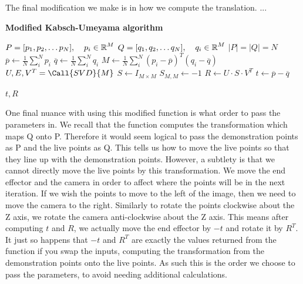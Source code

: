 The final modification we make is in how we compute the translation. ... %

\begin{algorithm}
    \setlength{\baselineskip}{18pt}
    \caption{\textbf{Modified Kabsch-Umeyama algorithm}}\label{alg:modified-kabsch}
    \begin{algorithmic}[1]
        \Require $P = [p_1, p_2, \dots p_N], \operatorname{\: \: \: \:} p_i \in \operatorname{\mathbb{R}}^M$
        \Statex $Q = [q_1, q_2, \dots q_N], \operatorname{\: \: \: \:} q_i \in \operatorname{\mathbb{R}}^M$
        \Ensure $|P| = |Q| = N$
            \State $\overline{p} \gets \frac{1}{N}\sum^N_{i} p_i$
            \State $\overline{q} \gets \frac{1}{N}\sum^N_{i} q_i$
            \State $M \gets \frac{1}{N}\sum^N_{i} (p_i - \overline{p})^T(q_i - \overline{q})$ 
            \State $U, E, V^T = \Call{SVD}{M}$ 
            \State $S \gets I_{M \times M}$ 
                \State $S_{M,M} \gets -1$                 
            \EndIf
            \State $R \gets U \cdot S \cdot V^T$
            \State $t \gets \overline{p} - \overline{q} $
    
            \State \Output $t, R$
        \EndProcedure
        
    \end{algorithmic}
\end{algorithm}

One final nuance with using this modified function is what order to pass the parameters in. We recall that the function computes the transformation which maps Q onto P. Therefore it would seem logical to pass the demonstration points as P and the live points as Q. This tells us how to move the live points so that they line up with the demonstration points. However, a subtlety is that we cannot directly move the live points by this transformation. We move the end effector and the camera in order to affect where the points will be in the next iteration. If we wish the points to move to the left of the image, then we need to move the camera to the right. Similarly to rotate the points clockwise about the Z axis, we rotate the camera anti-clockwise about the Z axis. This means after computing $t$ and $R$, we actually move the end effector by $-t$ and rotate it by $R^T$. It just so happens that $-t$ and $R^T$ are exactly the values returned from the function if you swap the inputs, computing the transformation from the demonstration points onto the live points. As such this is the order we choose to pass the parameters, to avoid needing additional calculations.


